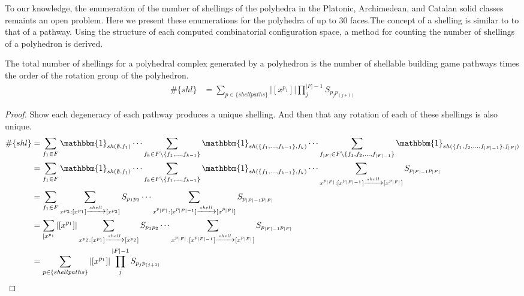 To our knowledge, the enumeration of the number of shellings of the polyhedra in the Platonic, Archimedean, and Catalan solid classes remaints an open problem. Here we present these enumerations for the polyhedra of up to $30$ faces.The concept of a shelling is similar to to that of a pathway. Using the structure of each computed combinatorial configuration space, a method for counting the number of shellings of a polyhedron is derived.

\begin{mythm}
The total number of shellings for a polyhedral complex generated by a polyhedron is the number of shellable building game pathways times the order of the rotation group of the polyhedron. 
\begin{align}
\#\{shl\} &= \sum_{p \in \{shell paths\}}|[x^{p_1}]|\prod_j^{|F|-1}S_{p_jp_{(j+1)}} 
\end{align}
\end{mythm}
\begin{proof}
Show each degeneracy of each pathway produces a unique shelling. And then that any rotation of each of these shellings is also unique.
\begin{align}
\#\{shl\} &= \sum_{f_1 \in F} \mathbbm{1}_{sh(\emptyset,f_1)} \cdots\sum_{f_k \in F\setminus \{f_1,\dots,f_{k-1}\}} \mathbbm{1}_{sh(\{f_1,\dots,f_{k-1}\}, f_k)}\cdots \sum_{f_{|F|} \in F\setminus \{f_1, f_2, \dots, f_{|F|-1}\}}\mathbbm{1}_{sh(\{f_1, f_2, \dots, f_{|F|-1}\},f_{|F|})}  \\
&= \sum_{f_1 \in F} \mathbbm{1}_{sh(\emptyset,f_1)} \cdots\sum_{f_k \in F\setminus \{f_1,\dots,f_{k-1}\}} \mathbbm{1}_{sh(\{f_1,\dots,f_{k-1}\}, f_k)}\cdots \sum_{x^{p_{|F|}}: [x^{p_{|F|-1}}] \xrightarrow{shell} [x^{p_{|F|}}]} S_{p_{|F|-1}p_{|F|}}  \\
&= \sum_{f_1 \in F} \sum_{x^{p_2}: [x^{p_1}] \xrightarrow{shell} [x^{p_2}]} S_{p_{1}p_{2}}  \cdots \sum_{x^{p_{|F|}}: [x^{p_{|F|-1}}] \xrightarrow{shell} [x^{p_{|F|}}]} S_{p_{|F|-1}p_{|F|}}  \\
&= \sum_{[x^{p_1}} |[x^{p_1}]| \sum_{x^{p_2}: [x^{p_1}] \xrightarrow{shell} [x^{p_2}]} S_{p_{1}p_{2}}  \cdots \sum_{x^{p_{|F|}}: [x^{p_{|F|-1}}] \xrightarrow{shell} [x^{p_{|F|}}]} S_{p_{|F|-1}p_{|F|}}  \\
&= \sum_{p \in \{shell paths\}}|[x^{p_1}]|\prod_j^{|F|-1}S_{p_jp_{(j+1)}} 
\end{align}
\end{proof}

